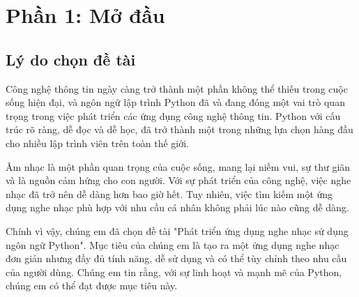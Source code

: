 \documentclass[a4paper]{article}
\begin{document}
\newpage
\tableofcontents
\newpage



\section{Phần 1: Mở đầu}
\subsection{Lý do chọn đề tài}

Công nghệ thông tin ngày càng trở thành một phần không thể thiếu trong cuộc sống hiện đại, và ngôn ngữ lập trình Python đã và đang đóng một vai trò quan trọng trong việc phát triển các ứng dụng công nghệ thông tin. Python với cấu trúc rõ ràng, dễ đọc và dễ học, đã trở thành một trong những lựa chọn hàng đầu cho nhiều lập trình viên trên toàn thế giới.

Âm nhạc là một phần quan trọng của cuộc sống, mang lại niềm vui, sự thư giãn và là nguồn cảm hứng cho con người. Với sự phát triển của công nghệ, việc nghe nhạc đã trở nên dễ dàng hơn bao giờ hết. Tuy nhiên, việc tìm kiếm một ứng dụng nghe nhạc phù hợp với nhu cầu cá nhân không phải lúc nào cũng dễ dàng.

Chính vì vậy, chúng em đã chọn đề tài "Phát triển ứng dụng nghe nhạc sử dụng ngôn ngữ Python". Mục tiêu của chúng em là tạo ra một ứng dụng nghe nhạc đơn giản nhưng đầy đủ tính năng, dễ sử dụng và có thể tùy chỉnh theo nhu cầu của người dùng. Chúng em tin rằng, với sự linh hoạt và mạnh mẽ của Python, chúng em có thể đạt được mục tiêu này.


\end{document}

